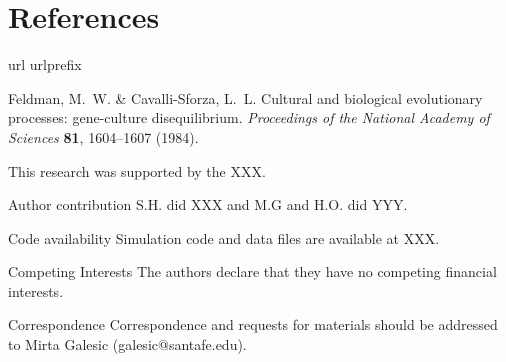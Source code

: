 \documentclass{nature}
\begin{document}
\section{References}

\begin{thebibliography}{10}
  \expandafter\ifx\csname url\endcsname\relax
    \def\url#1{\texttt{#1}}\fi
  \expandafter\ifx\csname urlprefix\endcsname\relax\def\urlprefix{URL }\fi
  \providecommand{\bibinfo}[2]{#2}
  \providecommand{\eprint}[2][]{\url{#2}}
  
  \bibinfo{author}{Feldman, M.~W.} \& \bibinfo{author}{Cavalli-Sforza, L.~L.}
  \newblock \bibinfo{title}{Cultural and biological evolutionary processes:
    gene-culture disequilibrium}.
  \newblock \emph{\bibinfo{journal}{Proceedings of the National Academy of
    Sciences}} \textbf{\bibinfo{volume}{81}}, \bibinfo{pages}{1604--1607}
    (\bibinfo{year}{1984}).
  
  \end{thebibliography}
  

\begin{addendum}
 \item This research was supported by the XXX.
 \item[Author contribution] S.H. did XXX and M.G and H.O. did YYY.
 \item[Code availability] Simulation code and data files are available at XXX.
 \item[Competing Interests] The authors declare that they have no competing financial interests.
 \item[Correspondence] Correspondence and requests for materials should be addressed to Mirta Galesic (galesic@santafe.edu).
\end{addendum}
\end{document}
